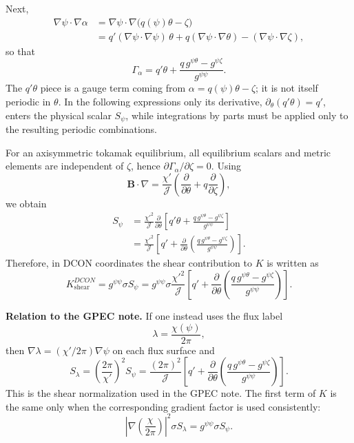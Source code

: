 \documentclass[10pt,a4paper]{article}
\numberwithin{equation}{section}
\begin{document}
Next,
\begin{align}
\nabla\psi\cdot\nabla\alpha
&=
\nabla\psi\cdot\nabla\big(q(\psi)\theta-\zeta\big)
\\
&=
q'(\nabla\psi\cdot\nabla\psi)\,\theta
+
q(\nabla\psi\cdot\nabla\theta)
-
(\nabla\psi\cdot\nabla\zeta),
\end{align}
so that
\begin{equation}
\Gamma_\alpha
=
q'\theta
+
\frac{q\,g^{\psi\theta}-g^{\psi\zeta}}{g^{\psi\psi}}.
\end{equation}
The \(q'\theta\) piece is a gauge term coming from
\(\alpha=q(\psi)\theta-\zeta\); it is not itself periodic in \(\theta\).  In the
following expressions only its derivative, \(\partial_\theta(q'\theta)=q'\),
enters the physical scalar \(S_\psi\), while integrations by parts must be
applied only to the resulting periodic combinations.

For an axisymmetric tokamak equilibrium, all equilibrium scalars and metric elements are
independent of $\zeta$, hence $\partial\Gamma_\alpha/\partial\zeta=0$. Using
\begin{equation}
\mathbf B\cdot\nabla
=
\frac{\chi'}{\mathcal J}
\left(
\frac{\partial}{\partial\theta}
+
q\frac{\partial}{\partial\zeta}
\right),
\end{equation}
we obtain
\begin{align}
S_{\psi}
&=
\frac{\chi'^2}{\mathcal J}
\frac{\partial}{\partial\theta}
\left[
q'\theta
+
\frac{q\,g^{\psi\theta}-g^{\psi\zeta}}{g^{\psi\psi}}
\right]
\\
&=
\boxed{
\frac{\chi'^2}{\mathcal J}
\left[
q'
+
\frac{\partial}{\partial\theta}
\left(
\frac{q\,g^{\psi\theta}-g^{\psi\zeta}}{g^{\psi\psi}}
\right)
\right].
}
\end{align}
Therefore, in DCON coordinates the shear contribution to $K$ is written as
\begin{equation}
\boxed{
K_{\mathrm{shear}}^{DCON}
=
g^{\psi\psi}\sigma S_{\psi}
=
g^{\psi\psi}\sigma
\frac{\chi'^2}{\mathcal J}
\left[
q'
+
\frac{\partial}{\partial\theta}
\left(
\frac{q\,g^{\psi\theta}-g^{\psi\zeta}}{g^{\psi\psi}}
\right)
\right].
}
\end{equation}

\noindent\textbf{Relation to the GPEC note.}
If one instead uses the flux label
\begin{equation}
\lambda = \frac{\chi(\psi)}{2\pi},
\end{equation}
then \(\nabla\lambda=(\chi'/2\pi)\nabla\psi\) on each flux surface and
\begin{equation}
S_{\lambda}
=
\left(\frac{2\pi}{\chi'}\right)^2 S_{\psi}
=
\frac{(2\pi)^2}{\mathcal J}
\left[
q'
+
\frac{\partial}{\partial\theta}
\left(
\frac{q\,g^{\psi\theta}-g^{\psi\zeta}}{g^{\psi\psi}}
\right)
\right].
\end{equation}
This is the shear normalization used in the GPEC note.  The first term of $K$ is the
same only when the corresponding gradient factor is used consistently:
\begin{equation}
\left|\nabla\left(\frac{\chi}{2\pi}\right)\right|^2\sigma S_{\lambda}
=
g^{\psi\psi}\sigma S_{\psi}.
\end{equation}
\end{document}
